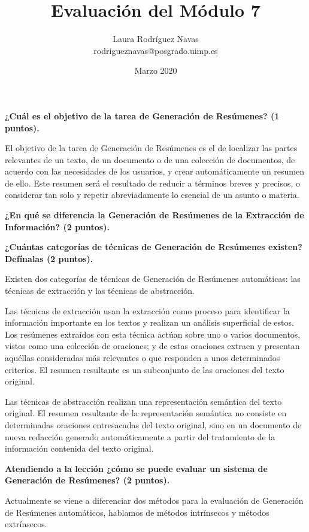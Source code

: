 \documentclass[11pt]{exam}
\title{Evaluación del Módulo 7}
\author{Laura Rodríguez Navas \\ rodrigueznavas@posgrado.uimp.es}
\date{Marzo 2020}
\begin{document}
	
\maketitle

\begin{questions}
	
{\bf \question ¿Cuál es el objetivo de la tarea de Generación de Resúmenes? (1 puntos).}

El objetivo de la tarea de Generación de Resúmenes es el de localizar las partes relevantes de un texto, de un documento o de una colección de documentos, de acuerdo con las necesidades de los usuarios, y crear automáticamente un resumen de ello. Este resumen será el resultado de reducir a términos breves y precisos, o considerar tan solo y repetir abreviadamente lo esencial de un asunto o materia.

{\bf \question ¿En qué se diferencia la Generación de Resúmenes de la Extracción de Información? (2 puntos).}

{\bf \question ¿Cuántas categorías de técnicas de Generación de Resúmenes existen? Defínalas (2 puntos).}

Existen dos categorías de técnicas de Generación de Resúmenes automáticas: las técnicas de extracción y las técnicas de abstracción.

Las técnicas de extracción usan la extracción como proceso para identificar la información importante en los textos y realizan un análisis superficial de estos. Los resúmenes extraídos con esta técnica actúan sobre uno o varios documentos, vistos como una colección de oraciones; y de estas oraciones extraen y presentan aquéllas consideradas más relevantes o que responden a unos determinados criterios. El resumen resultante es un subconjunto de las oraciones del texto original.

Las técnicas de abstracción realizan una representación semántica del texto original. El resumen resultante de la representación semántica no consiste en determinadas oraciones entresacadas del texto original, sino en un documento de nueva redacción generado automáticamente a partir del tratamiento de la información contenida del texto original.

{\bf \question Atendiendo a la lección ¿cómo se puede evaluar un sistema de Generación de Resúmenes? (2 puntos).}

Actualmente se viene a diferenciar dos métodos para la evaluación de Generación de Resúmenes automáticos, hablamos de métodos intrínsecos y métodos extrínsecos.



\end{questions}
\end{document}
